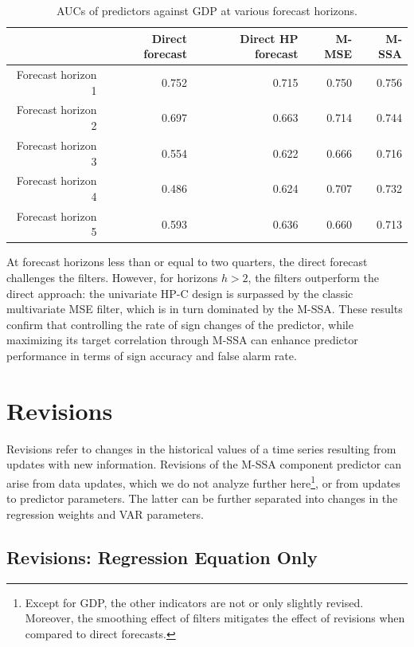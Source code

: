 \documentclass[11pt,a4paper]{article}
\begin{document}
\begin{table}[ht]
\centering
\begin{tabular}{rrrrr}
  \hline
 & Direct forecast & Direct HP forecast & M-MSE & M-SSA \\ 
  \hline
Forecast horizon 1 & 0.752 & 0.715 & 0.750 & 0.756 \\ 
  Forecast horizon 2 & 0.697 & 0.663 & 0.714 & 0.744 \\ 
  Forecast horizon 3 & 0.554 & 0.622 & 0.666 & 0.716 \\ 
  Forecast horizon 4 & 0.486 & 0.624 & 0.707 & 0.732 \\ 
  Forecast horizon 5 & 0.593 & 0.636 & 0.660 & 0.713 \\ 
   \hline
\end{tabular}
\caption{AUCs of predictors against GDP at various forecast horizons.} 
\label{auc}
\end{table}At forecast horizons less than or equal to two quarters, the direct forecast challenges the filters. However, for horizons $h>2$, the filters outperform the direct approach: the univariate HP-C design is surpassed by the classic multivariate MSE filter, which is in turn dominated by the M-SSA. These results confirm that controlling the rate of sign changes of the predictor, while maximizing its target correlation through M-SSA can enhance predictor performance in terms of sign accuracy and false alarm rate.



\section{Revisions}\label{sec:revisions}



Revisions refer to changes in the historical values of a time series resulting from updates with new information. Revisions of the M-SSA component predictor can arise from data updates, which we do not analyze further here\footnote{Except for GDP, the other indicators are not or only slightly revised. Moreover, the smoothing effect of filters mitigates the effect of revisions when compared to direct forecasts.}, or from updates to predictor parameters. The latter can be further separated into changes in the regression weights and VAR parameters. 


\subsection{Revisions: Regression Equation Only}
\end{document}
